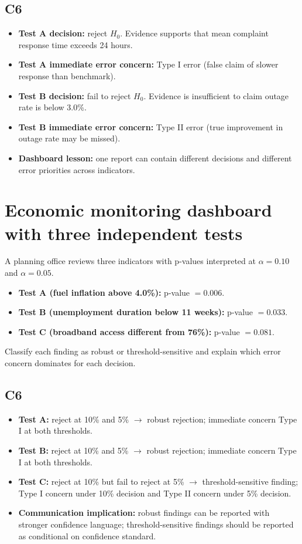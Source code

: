 \begin{ExamProblems}
\subsection*{C6}
\begin{itemize}
    \item \textbf{Test A decision:} reject \(H_0\). Evidence supports that mean complaint response time exceeds 24 hours.
    \item \textbf{Test A immediate error concern:} Type I error (false claim of slower response than benchmark).
    \item \textbf{Test B decision:} fail to reject \(H_0\). Evidence is insufficient to claim outage rate is below 3.0\%.
    \item \textbf{Test B immediate error concern:} Type II error (true improvement in outage rate may be missed).
    \item \textbf{Dashboard lesson:} one report can contain different decisions and different error priorities across indicators.
\end{itemize}

\item
\section{Economic monitoring dashboard with three independent tests}
A planning office reviews three indicators with p-values interpreted at \(\alpha=0.10\) and \(\alpha=0.05\).
\begin{itemize}
    \item \textbf{Test A (fuel inflation above 4.0\%):} p-value \(=0.006\).
    \item \textbf{Test B (unemployment duration below 11 weeks):} p-value \(=0.033\).
    \item \textbf{Test C (broadband access different from 76\%):} p-value \(=0.081\).
\end{itemize}
Classify each finding as robust or threshold-sensitive and explain which error concern dominates for each decision.

\subsection*{C6}
\begin{itemize}
    \item \textbf{Test A:} reject at 10\% and 5\% $\rightarrow$ robust rejection; immediate concern Type I at both thresholds.
    \item \textbf{Test B:} reject at 10\% and 5\% $\rightarrow$ robust rejection; immediate concern Type I at both thresholds.
    \item \textbf{Test C:} reject at 10\% but fail to reject at 5\% $\rightarrow$ threshold-sensitive finding; Type I concern under 10\% decision and Type II concern under 5\% decision.
    \item \textbf{Communication implication:} robust findings can be reported with stronger confidence language; threshold-sensitive findings should be reported as conditional on confidence standard.
\end{itemize}


\end{ExamProblems}
